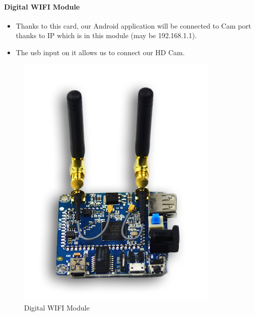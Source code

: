 \documentclass[11pt]{article}
\begin{document}
\vspace{0.2cm}

\paragraph{Digital WIFI Module}
\begin{itemize}
\item Thanks to this card, our Android application will be connected to Cam
port thanks to IP which is in this module (may be 192.168.1.1).
\item The usb input on it allows us to connect our HD Cam.
\end{itemize}
\begin{figure}[h]
\centering
\includegraphics[scale=0.35]{wifi.png}
\caption{Digital WIFI Module}
\end{figure}

\pagebreak
\end{document}
